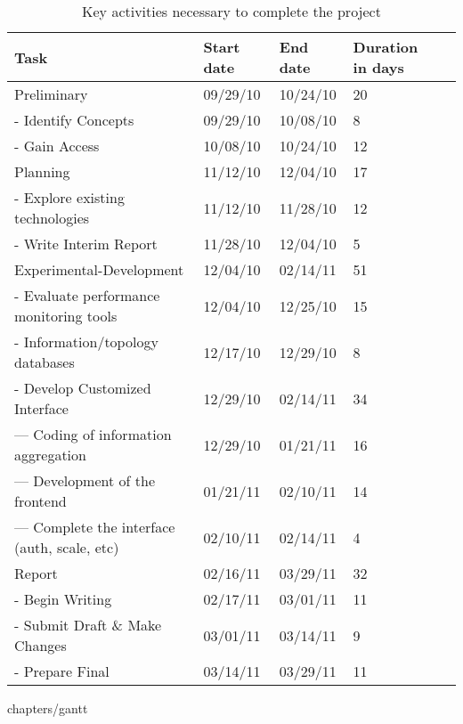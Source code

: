 \begin{table}[ht]
\begin{tabular}{ | l | l | l | l | r |}
\hline
Task & Start date & End date & Duration in days \\ \hline
  Preliminary & 09/29/10 & 10/24/10 & 20 \\ \hline 
  -  Identify Concepts & 09/29/10 & 10/08/10 & 8 \\ \hline 
  -  Gain Access & 10/08/10 & 10/24/10 & 12 \\ \hline 
  Planning & 11/12/10 & 12/04/10 & 17 \\ \hline 
  -  Explore existing technologies & 11/12/10 & 11/28/10 & 12 \\ \hline 
  -  Write Interim Report & 11/28/10 & 12/04/10 & 5 \\ \hline 
  Experimental-Development & 12/04/10 & 02/14/11 & 51 \\ \hline 
  -  Evaluate performance monitoring tools & 12/04/10 & 12/25/10 & 15 \\ \hline 
  -  Information/topology databases & 12/17/10 & 12/29/10 & 8 \\ \hline 
  -  Develop Customized Interface & 12/29/10 & 02/14/11 & 34 \\ \hline 
  ---    Coding of information aggregation & 12/29/10 & 01/21/11 & 16 \\ \hline 
  ---    Development of the frontend & 01/21/11 & 02/10/11 & 14 \\ \hline 
  ---    Complete the interface (auth, scale, etc) & 02/10/11 & 02/14/11 & 4 \\
      \hline Report & 02/16/11 & 03/29/11 & 32 \\ \hline 
  -  Begin Writing & 02/17/11 & 03/01/11 & 11 \\ \hline 
  -  Submit Draft \& Make Changes & 03/01/11 & 03/14/11 & 9 \\ \hline 
  -  Prepare Final & 03/14/11 & 03/29/11 & 11 \\ \hline 
\end{tabular}
\caption{Key activities necessary to complete the project}
\label{tab:tasks}
\end{table}

 {chapters/gantt}

